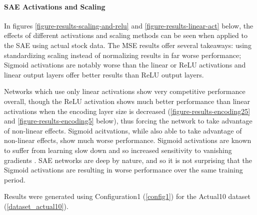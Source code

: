 \documentclass[a4paper,latin]{paper}
\begin{document}
\paragraph{SAE Activations and Scaling}\label{results_sae_activations_scaling}

In figures \ref{figure-results-scaling-and-relu} and \ref{figure-results-linear-act} below, the effects of different activations and scaling methods can be seen when applied to the SAE using actual stock data. The MSE results offer several takeaways: using standardizing scaling instead of normalizing results in far worse performance; Sigmoid activations are notably worse than the linear or ReLU activations and linear output layers offer better results than ReLU output layers. \newline

 Networks which use only linear activations show very competitive performance overall, though the ReLU activation shows much better performance than linear activations when the encoding layer size is decreased (\ref{figure-results-encoding25} and \ref{figure-results-encoding5} below), thus forcing the network to take advantage of non-linear effects. Sigmoid acitvations, while also able to take advantage of non-linear effects, show much worse performance. Sigmoid activations are known to suffer from learning slow down and so increased sensitivity to vanishing gradients . SAE networks are deep by nature, and so it is not surprising that the Sigmoid activations are resulting in worse performance over the same training period. \newline

Results were generated using Configuration1 (\ref{config1}) for the Actual10 dataset (\ref{dataset_actual10}).\newline

\end{document}
